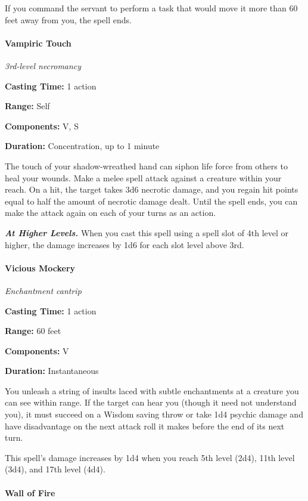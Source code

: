 \documentclass[
]{article}
\begin{document}
If you command the servant to perform a task that would move it more
than 60 feet away from you, the spell ends.

\hypertarget{vampiric-touch}{%
\paragraph{Vampiric Touch}\label{vampiric-touch}}

\emph{3rd-level necromancy}

\textbf{Casting Time:} 1 action

\textbf{Range:} Self

\textbf{Components:} V, S

\textbf{Duration:} Concentration, up to 1 minute

The touch of your shadow-wreathed hand can siphon life force from others
to heal your wounds. Make a melee spell attack against a creature within
your reach. On a hit, the target takes 3d6 necrotic damage, and you
regain hit points equal to half the amount of necrotic damage dealt.
Until the spell ends, you can make the attack again on each of your
turns as an action.

\emph{\textbf{At Higher Levels.}} When you cast this spell using a spell
slot of 4th level or higher, the damage increases by 1d6 for each slot
level above 3rd.

\hypertarget{vicious-mockery}{%
\paragraph{Vicious Mockery}\label{vicious-mockery}}

\emph{Enchantment cantrip}

\textbf{Casting Time:} 1 action

\textbf{Range:} 60 feet

\textbf{Components:} V

\textbf{Duration:} Instantaneous

You unleash a string of insults laced with subtle enchantments at a
creature you can see within range. If the target can hear you (though it
need not understand you), it must succeed on a Wisdom saving throw or
take 1d4 psychic damage and have disadvantage on the next attack roll it
makes before the end of its next turn.

This spell's damage increases by 1d4 when you reach 5th level (2d4),
11th level (3d4), and 17th level (4d4).

\hypertarget{wall-of-fire}{%
\paragraph{Wall of Fire}\label{wall-of-fire}}
\end{document}
